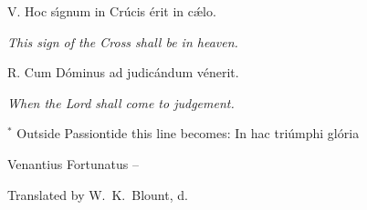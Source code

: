 \endlyrics

\medskip

\s V. Hoc s\'\i gnum in Cr\'ucis \'erit in c\'\ae lo.

{\hskip20mm \it This sign of the Cross shall be in heaven.}

\s R. Cum D\'ominus ad judic\'andum v\'enerit.

{\hskip20mm \it When the Lord shall come to judgement.}

\bigskip

{\noindent\smallrm  $^*$ Outside Passiontide this line becomes: {\smallit In hac tri\'umphi gl\'oria}}

\source Venantius Fortunatus {}--

\source Translated by W.~K.~Blount, d.~{}




